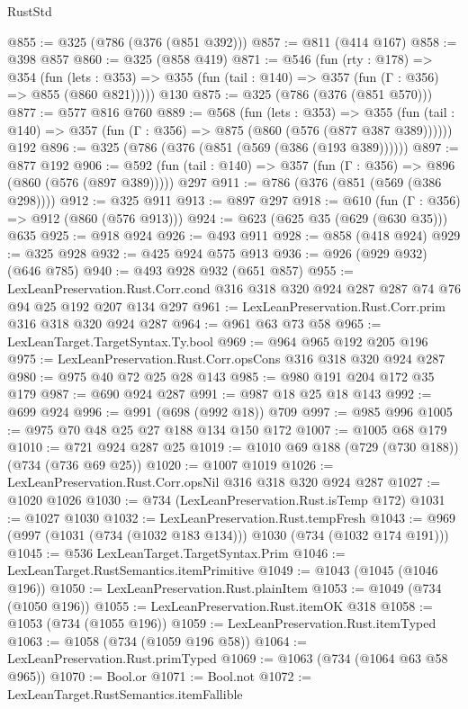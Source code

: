 \begin{lexlean}{RustStd}
\begin{coremodule}
@855 := @325 (@786 (@376 (@851 @392)))
@857 := @811 (@414 @167)
@858 := @398 @857
@860 := @325 (@858 @419)
@871 := @546
    (fun (rty : @178) =>
    @354
      (fun (lets : @353) => @355 (fun (tail : @140) => @357 (fun (Γ : @356) => @855 (@860 @821)))))
    @130
@875 := @325 (@786 (@376 (@851 @570)))
@877 := @577 @816 @760
@889 := @568
    (fun (lets : @353) =>
    @355 (fun (tail : @140) => @357 (fun (Γ : @356) => @875 (@860 (@576 (@877 @387 @389))))))
    @192
@896 := @325 (@786 (@376 (@851 (@569 (@386 (@193 @389))))))
@897 := @877 @192
@906 := @592 (fun (tail : @140) => @357 (fun (Γ : @356) => @896 (@860 (@576 (@897 @389))))) @297
@911 := @786 (@376 (@851 (@569 (@386 @298))))
@912 := @325 @911
@913 := @897 @297
@918 := @610 (fun (Γ : @356) => @912 (@860 (@576 @913)))
@924 := @623 (@625 @35 (@629 (@630 @35))) @635
@925 := @918 @924
@926 := @493 @911
@928 := @858 (@418 @924)
@929 := @325 @928
@932 := @425 @924 @575 @913
@936 := @926 (@929 @932) (@646 @785)
@940 := @493 @928 @932 (@651 @857)
@955 := LexLeanPreservation.Rust.Corr.cond
    @316
    @318
    @320
    @924
    @287
    @287
    @74
    @76
    @94
    @25
    @192
    @207
    @134
    @297
@961 := LexLeanPreservation.Rust.Corr.prim @316 @318 @320 @924 @287
@964 := @961 @63 @73 @58
@965 := LexLeanTarget.TargetSyntax.Ty.bool
@969 := @964 @965 @192 @205 @196
@975 := LexLeanPreservation.Rust.Corr.opsCons @316 @318 @320 @924 @287
@980 := @975 @40 @72 @25 @28 @143
@985 := @980 @191 @204 @172 @35 @179
@987 := @690 @924 @287
@991 := @987 @18 @25 @18 @143
@992 := @699 @924
@996 := @991 (@698 (@992 @18)) @709
@997 := @985 @996
@1005 := @975 @70 @48 @25 @27 @188 @134 @150 @172
@1007 := @1005 @68 @179
@1010 := @721 @924 @287 @25
@1019 := @1010 @69 @188 (@729 (@730 @188)) (@734 (@736 @69 @25))
@1020 := @1007 @1019
@1026 := LexLeanPreservation.Rust.Corr.opsNil @316 @318 @320 @924 @287
@1027 := @1020 @1026
@1030 := @734 (LexLeanPreservation.Rust.isTemp @172)
@1031 := @1027 @1030
@1032 := LexLeanPreservation.Rust.tempFresh
@1043 := @969 (@997 (@1031 (@734 (@1032 @183 @134))) @1030 (@734 (@1032 @174 @191)))
@1045 := @536 LexLeanTarget.TargetSyntax.Prim
@1046 := LexLeanTarget.RustSemantics.itemPrimitive
@1049 := @1043 (@1045 (@1046 @196))
@1050 := LexLeanPreservation.Rust.plainItem
@1053 := @1049 (@734 (@1050 @196))
@1055 := LexLeanPreservation.Rust.itemOK @318
@1058 := @1053 (@734 (@1055 @196))
@1059 := LexLeanPreservation.Rust.itemTyped
@1063 := @1058 (@734 (@1059 @196 @58))
@1064 := LexLeanPreservation.Rust.primTyped
@1069 := @1063 (@734 (@1064 @63 @58 @965))
@1070 := Bool.or
@1071 := Bool.not
@1072 := LexLeanTarget.RustSemantics.itemFallible

\end{coremodule}
\end{lexlean}
